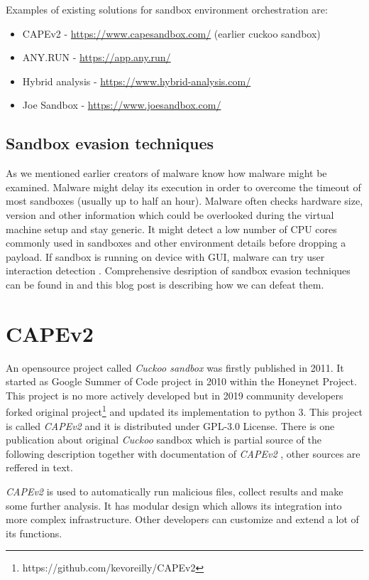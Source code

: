 Examples of existing solutions for sandbox environment orchestration are:
\begin{itemize}
  \item CAPEv2 - \url{https://www.capesandbox.com/} (earlier cuckoo sandbox)
  \item ANY.RUN - \url{https://app.any.run/}
  \item Hybrid analysis - \url{https://www.hybrid-analysis.com/}
  \item Joe Sandbox - \url{https://www.joesandbox.com/}
\end{itemize}

\subsection{Sandbox evasion techniques}
As we mentioned earlier creators of malware know how malware might be examined. Malware might delay its execution in order to overcome the timeout of most sandboxes (usually up to half an hour). Malware often checks hardware size, version and other information which could be overlooked during the virtual machine setup and stay generic. It might detect a low number of CPU cores commonly used in sandboxes and other environment details before dropping a payload. If sandbox is running on device with GUI, malware can try user interaction detection \cite{Evolutio45:online}. Comprehensive desription of sandbox evasion techniques can be found in \cite{Afianian2018} and this blog post \cite{Chailytko2019} is describing how we can defeat them.

\section{CAPEv2}
An opensource project called \emph{Cuckoo sandbox} was firstly published in 2011. It started as Google Summer of Code project in 2010 within the Honeynet Project. This project is no more actively developed but in 2019 community developers forked original project\footnote{https://github.com/kevoreilly/CAPEv2} and updated its implementation to python 3. This project is called \emph{CAPEv2} and it is distributed under GPL-3.0 License. There is one publication about original \emph{Cuckoo} sandbox \cite{Oktavianto2013} which is partial source of the following description together with documentation of \emph{CAPEv2} \cite{CAPESand75:online}, other sources are reffered in text.

\emph{CAPEv2} is used to automatically run malicious files, collect results and make some further analysis. It has modular design which allows its integration into more complex infrastructure. Other developers can customize and extend a lot of its functions.

